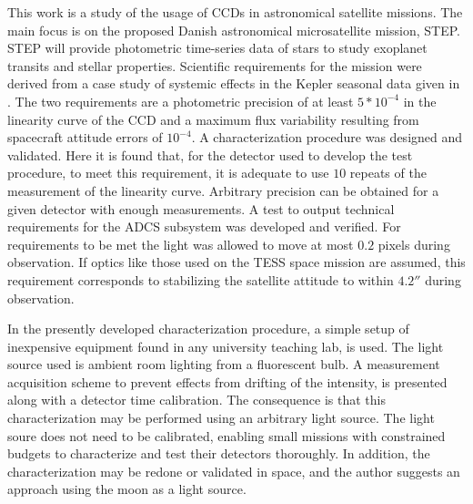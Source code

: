 \documentclass[12pt, a4paper, twoside, article]{memoir}
\newenvironment{changemargin}[2]{%
	\begin{list}{}{%
			\setlength{\topsep}{0pt}%
			\setlength{\leftmargin}{#1}%
			\setlength{\rightmargin}{#2}%
			\setlength{\listparindent}{\parindent}%
			\setlength{\itemindent}{\parindent}%
			\setlength{\parsep}{\parskip}%
		}%
		\item[]}{\end{list}}
\begin{document}
	\begin{changemargin}{-0.225cm}{-1cm}
	\begin{tcolorbox}[colback = black, colframe = black, sharpish corners]
		\color{white} This work is a study of the usage of CCDs in astronomical satellite missions. The main focus is on the proposed Danish astronomical microsatellite mission, STEP. STEP will provide photometric time-series data of stars to study exoplanet transits and stellar properties. Scientific requirements for the mission were derived from a case study of systemic effects in the Kepler seasonal data given in \cite{hatp7}. The two requirements are a photometric precision of at least  $5*10^{-4}$ in the linearity curve of the CCD and a maximum flux variability resulting from spacecraft attitude errors of $10^{-4}$. A characterization procedure was designed and validated. Here it is found that, for the detector used to develop the test procedure, to meet this requirement, it is adequate to use $10$ repeats of the measurement of the linearity curve. Arbitrary precision can be obtained for a given detector with enough measurements. A test to output technical requirements for the ADCS subsystem was developed and verified. For requirements to be met the light was allowed to move at most $ 0.2 $ pixels during observation. If optics like those used on the TESS space mission are assumed, this requirement corresponds to stabilizing the satellite attitude to within $4.2''$ during observation. 
		
		In the presently developed characterization procedure, a simple setup of inexpensive equipment found in any university teaching lab, is used. The light source used is ambient room lighting from a fluorescent bulb. A measurement acquisition scheme to prevent effects from drifting of the intensity, is presented along with a detector time calibration. The consequence is that this characterization may be performed using an arbitrary light source. The light soure does not need to be calibrated, enabling small missions with constrained budgets to characterize and test their detectors thoroughly. In addition, the characterization may be redone or validated in space, and the author suggests an approach using the moon as a light source.
	\end{tcolorbox}
	
\end{changemargin}	
\end{document}
